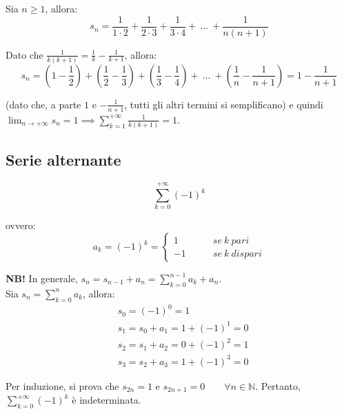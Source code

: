 \documentclass{article}
\begin{document}
\noindent Sia $n \geq 1$, allora:
\begin{equation*}
    s_n = \frac{1}{1 \cdot 2} + \frac{1}{2 \cdot 3} + \frac{1}{3 \cdot 4} + \ ... \ + \frac{1}{n(n + 1)}
\end{equation*}

\noindent Dato che $\frac{1}{k(k + 1)} = \frac{1}{k} - \frac{1}{k + 1}$, allora:
\begin{equation*}
    s_n = \left(1 - \frac{1}{2}\right) + \left(\frac{1}{2} - \frac{1}{3}\right) + \left(\frac{1}{3} - \frac{1}{4}\right) + \ ... \ + \left(\frac{1}{n} - \frac{1}{n + 1}\right) = 1 - \frac{1}{n + 1}
\end{equation*}

\noindent (dato che, a parte $1$ e $-\frac{1}{n + 1}$, tutti gli altri termini si semplificano) e quindi $\lim_{n \to +\infty} s_n = 1 \implies \sum_{k = 1}^{+\infty} \frac{1}{k(k + 1)} = 1$.

\subsection{Serie alternante}
\begin{equation*}
    \sum_{k = 0}^{+\infty} (-1)^k
\end{equation*}

\noindent ovvero:
\begin{equation*}
    a_k = (-1)^k = \begin{cases}
        1 \qquad & se \ k \ pari \\
        -1 \qquad & se \ k \ dispari
    \end{cases} 
\end{equation*}

\noindent\textbf{NB!} In generale, $s_n = s_{n - 1} + a_n = \sum_{k = 0}^{n - 1} a_k + a_n$.\\

\noindent Sia $s_n = \sum_{k = 0}^n a_k$, allora:
\begin{align*}
    & s_0 = (-1)^0 = 1 \\
    & s_1 = s_0 + a_1 = 1 + (-1)^1 = 0 \\
    & s_2 = s_1 + a_2 = 0 + (-1)^2 = 1 \\
    & s_3 = s_2 + a_3 = 1 + (-1)^3 = 0
\end{align*}

\noindent Per induzione, si prova che $s_{2n} = 1$ e $s_{2n + 1} = 0 \qquad \forall n \in \mathbb{N}$. Pertanto, $\sum_{k = 0}^{+\infty} (-1)^k$ è indeterminata. 
\end{document}
